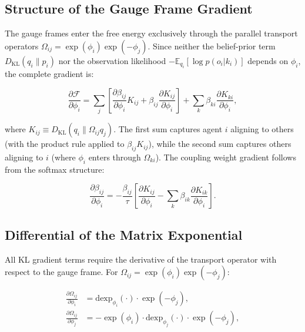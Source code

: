 \documentclass[twoside,11pt]{article}
\begin{document}
\subsection{Structure of the Gauge Frame Gradient}

The gauge frames enter the free energy exclusively through the parallel transport operators $\Omega_{ij} = \exp(\phi_i)\exp(-\phi_j)$. Since neither the belief-prior term $D_{\mathrm{KL}}(q_i \| p_i)$ nor the observation likelihood $-\mathbb{E}_{q_i}[\log p(o_i | k_i)]$ depends on $\phi_i$, the complete gradient is:

\begin{equation}
\frac{\partial \mathcal{F}}{\partial \phi_i}
= \sum_j \left[
\frac{\partial \beta_{ij}}{\partial \phi_i} K_{ij}
+ \beta_{ij} \frac{\partial K_{ij}}{\partial \phi_i}
\right]
+ \sum_k \beta_{ki} \frac{\partial K_{ki}}{\partial \phi_i},
\label{eq:phi_grad_complete}
\end{equation}

where $K_{ij} \equiv D_{\mathrm{KL}}(q_i \| \Omega_{ij} q_j)$. The first sum captures agent $i$ aligning to others (with the product rule applied to $\beta_{ij} K_{ij}$), while the second sum captures others aligning to $i$ (where $\phi_i$ enters through $\Omega_{ki}$). The coupling weight gradient follows from the softmax structure:

\begin{equation}
\frac{\partial \beta_{ij}}{\partial \phi_i} = -\frac{\beta_{ij}}{\tau}\left[
\frac{\partial K_{ij}}{\partial \phi_i} - \sum_k \beta_{ik} \frac{\partial K_{ik}}{\partial \phi_i}
\right].
\label{eq:beta_grad_phi}
\end{equation}

\subsection{Differential of the Matrix Exponential}

All KL gradient terms require the derivative of the transport operator with respect to the gauge frame. For $\Omega_{ij} = \exp(\phi_i)\exp(-\phi_j)$:

\begin{align}
\frac{\partial \Omega_{ij}}{\partial \phi_i} &= \mathrm{dexp}_{\phi_i}(\cdot) \cdot \exp(-\phi_j), \label{eq:dOmega_dphi_i} \\
\frac{\partial \Omega_{ij}}{\partial \phi_j} &= -\exp(\phi_i) \cdot \mathrm{dexp}_{\phi_j}(\cdot) \cdot \exp(-\phi_j), \label{eq:dOmega_dphi_j}
\end{align}
\end{document}
